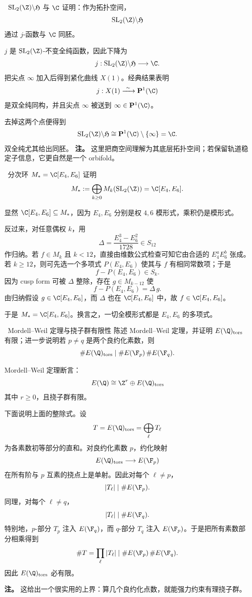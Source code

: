 \begin{problem}{\hard\ $\mathrm{SL}_2(\Z)\backslash\mathfrak{H}$ 与 $\C$}
证明：作为拓扑空间，
\[
\mathrm{SL}_2(\Z)\backslash\mathfrak{H}
\]
通过 $j$-函数与 $\C$ 同胚。
\end{problem}
\begin{solution}
$j$ 是 $\mathrm{SL}_2(\Z)$-不变全纯函数，因此下降为
\[
j:\mathrm{SL}_2(\Z)\backslash\mathfrak{H}\longrightarrow \C.
\]
把尖点 $\infty$ 加入后得到紧化曲线 $X(1)$。经典结果表明
\[
j:X(1)\xrightarrow{\ \sim\ }\mathbf{P}^1(\C)
\]
是双全纯同构，并且尖点 $\infty$ 被送到 $\infty\in \mathbf{P}^1(\C)$。

去掉这两个点便得到
\[
\mathrm{SL}_2(\Z)\backslash\mathfrak{H}
\cong
\mathbf{P}^1(\C)\setminus\{\infty\}
=\C.
\]
双全纯尤其给出同胚。 \textbf{注。} 这里把商空间理解为其底层拓扑空间；若保留轨道稳定子信息，它更自然是一个 orbifold。
\end{solution}

\begin{problem}{\hard\ 分次环 $M_*=\C[E_4,E_6]$}
证明
\[
M_*:=\bigoplus_{k\ge0} M_k(\mathrm{SL}_2(\Z))
=
\C[E_4,E_6].
\]
\end{problem}
\begin{solution}
显然 $\C[E_4,E_6]\subseteq M_*$，因为 $E_4,E_6$ 分别是权 $4,6$ 模形式，乘积仍是模形式。

反过来，对任意偶权 $k$，用
\[
\Delta=\frac{E_4^3-E_6^2}{1728}\in S_{12}
\]
作归纳。若 $f\in M_k$ 且 $k<12$，直接由维数公式检查可知它由合适的 $E_4^aE_6^b$ 张成。若 $k\ge12$，则可先选一个多项式 $P(E_4,E_6)$ 使其与 $f$ 有相同常数项；于是
\[
f-P(E_4,E_6)\in S_k.
\]
因为 cusp form 可被 $\Delta$ 整除，存在 $g\in M_{k-12}$ 使
\[
f-P(E_4,E_6)=\Delta\,g.
\]
由归纳假设 $g\in\C[E_4,E_6]$，而 $\Delta$ 也在 $\C[E_4,E_6]$ 中，故 $f\in\C[E_4,E_6]$。

于是 $M_*=\C[E_4,E_6]$。换言之，一切全模形式都是 $E_4,E_6$ 的多项式。
\end{solution}

\begin{problem}{\hard\ Mordell--Weil 定理与挠子群有限性}
陈述 Mordell--Weil 定理，并证明 $E(\Q)_{\mathrm{tors}}$ 有限；进一步说明若 $p\neq q$ 是两个良约化素数，则
\[
\#E(\Q)_{\mathrm{tors}}\mid \#E(\F_p)\,\#E(\F_q).
\]
\end{problem}
\begin{solution}
Mordell--Weil 定理断言：
\[
E(\Q)\cong \Z^r\oplus E(\Q)_{\mathrm{tors}}
\]
其中 $r\ge0$，且挠子群有限。

下面说明上面的整除式。设
\[
T=E(\Q)_{\mathrm{tors}}=\bigoplus_\ell T_\ell
\]
为各素数初等部分的直和。对良约化素数 $p$，约化映射
\[
E(\Q)_{\mathrm{tors}}\longrightarrow E(\F_p)
\]
在所有阶与 $p$ 互素的挠点上是单射。因此对每个 $\ell\neq p$，
\[
|T_\ell|\mid \#E(\F_p).
\]
同理，对每个 $\ell\neq q$，
\[
|T_\ell|\mid \#E(\F_q).
\]
特别地，$p$-部分 $T_p$ 注入 $E(\F_q)$，而 $q$-部分 $T_q$ 注入 $E(\F_p)$。于是把所有素数部分相乘得到
\[
\#T=\prod_\ell |T_\ell|
\mid \#E(\F_p)\,\#E(\F_q).
\]
因此 $E(\Q)_{\mathrm{tors}}$ 必有限。

\textbf{注。} 这给出一个很实用的上界：算几个良约化点数，就能强力约束有理挠子群。
\end{solution}

